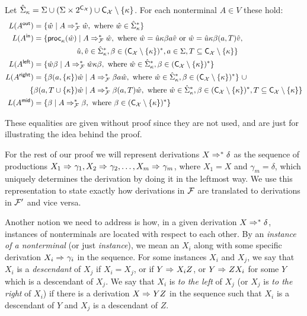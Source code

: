 Let $\hat{\Sigma}_{\kappa} = \Sigma \cup (\Sigma\times2^{\textsf{C}_{\mathcal{X}}}) \cup \textsf{C}_{\mathcal{X}}\setminus\{\kappa\}$. For each nonterminal $A\in V$ these hold:
\begin{align*}
	L(A^{\mathsf{out}}) &= \{\hat{w}\mid 
	A\Rightarrow_{\mathcal{F}}^* \hat{w}, 
	\ \text{where } \hat{w} \in  \hat{\Sigma}_{\kappa}^*\}\\
	L(A^{\mathsf{in}}) &= \{\mathsf{proc}_{\kappa}(\hat{w}) \mid 
	A\Rightarrow_{\mathcal{F}}^* \hat{w},
	\ \text{where } \hat{w} = \hat{u}\kappa\beta a \hat{v} \text{ or }\hat{w} = \hat{u}\kappa\beta (a, T) \hat{v},\\ 
	&\ \ \ \ \ \ \ \ \ \ \ \ \ \ \ \ \  \hat{u}, \hat{v} \in \hat{\Sigma}_{\kappa}^*, \beta\in (\textsf{C}_{\mathcal{X}}\setminus\{\kappa\})^*, a\in\Sigma, T\subseteq\textsf{C}_{\mathcal{X}}\setminus\{\kappa\}\}\\
	L(A^{\mathsf{left}}) &= \{\hat{w}\beta \mid 
	A\Rightarrow_{\mathcal{F}}^* \hat{w}\kappa\beta,
	\ \text{where } \hat{w}\in\hat{\Sigma}_{\kappa}^*, \beta\in(\textsf{C}_{\mathcal{X}}\setminus\{\kappa\})^*\}\\
	L(A^{\mathsf{right}}) &= \{\beta(a, \{\kappa\})\hat{w} \mid 
	A\Rightarrow_{\mathcal{F}}^* \beta a \hat{w},
	\ \text{where } \hat{w}\in \hat{\Sigma}_\kappa^*, \beta\in(\textsf{C}_{\mathcal{X}}\setminus\{\kappa\})^*
	\} \ \cup\\ 
	& \!\!\!\{\beta(a, T\cup \{\kappa\})\hat{w} \mid 
	A\Rightarrow_{\mathcal{F}}^* \beta (a,T) \hat{w},
	\ \text{where }\hat{w}\in\hat{\Sigma}_\kappa^*, \beta\in(\textsf{C}_{\mathcal{X}}\setminus\{\kappa\})^*, T\subseteq\textsf{C}_{\mathcal{X}}\setminus\{\kappa\}\}\\
	L(A^{\mathsf{mid}}) &= \{\beta\mid A \Rightarrow_{\mathcal{F}}^*\beta,
	\ \text{where }\beta\in(\textsf{C}_{\mathcal{X}}\setminus\{\kappa\})^*\}
\end{align*}

These equalities are given without proof since they are not used, and are just for illustrating the idea behind the proof.

For the rest of our proof we will represent derivations $X\Rightarrow_{}^* \delta$ as the sequence of productions $X_1\Rightarrow_{}\gamma_1, X_2\Rightarrow_{}\gamma_2, \ldots,X_m\Rightarrow_{}\gamma_m$, where $X_1 = X$ and $\gamma_m = \delta$, which uniquely determines the derivation by doing it in the leftmost way. We use this representation to state exactly how derivations in $\mathcal{F}$ are translated to derivations in $\mathcal{F}'$ and vice versa.

Another notion we need to address is how, in a given derivation $X\Rightarrow_{}^* \delta$, instances of nonterminals are located with respect to each other. By an \emph{instance of a nonterminal} (or just \emph{instance}), we mean an $X_i$ along with some specific derivation $X_i\Rightarrow_{} \gamma_i$ in the sequence. For some instances $X_i$ and $X_j$, we say that $X_i$ is a \emph{descendant} of $X_j$ if $X_i = X_j$, or if $Y \Rightarrow_{} X_i Z$, or $Y\Rightarrow_{} Z X_i$ for some $Y$ which is a descendant of $X_j$. We say that $X_i$ is \emph{to the left} of $X_j$ (or $X_j$ is \emph{to the right} of $X_i$) if there is a derivation $X\Rightarrow_{} Y Z$ in the sequence such that $X_i$ is a descendant of $Y$ and $X_j$ is a descendant of $Z$. 

